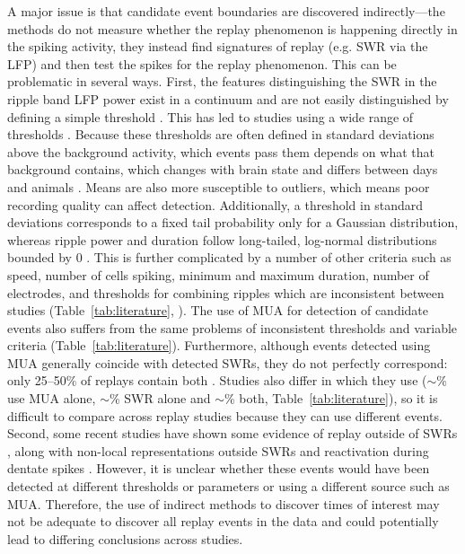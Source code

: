 \documentclass[11pt]{article}
\begin{document}
A major issue is that candidate event boundaries are discovered indirectly—the methods do not measure whether the replay phenomenon is happening directly in the spiking activity, they instead find signatures of replay (e.g. SWR via the LFP) and then test the spikes for the replay phenomenon. This can be problematic in several ways. First, the features distinguishing the SWR in the ripple band LFP power exist in a continuum and are not easily distinguished by defining a simple threshold \cite{YuDistincthippocampalcorticalmemory2017,Liuconsensusstatementdetection2022}. This has led to studies using a wide range of thresholds \cite{Liuconsensusstatementdetection2022}. Because these thresholds are often defined in standard deviations above the background activity, which events pass them depends on what that background contains, which changes with brain state and differs between days and animals \cite{Liuconsensusstatementdetection2022,YuDistincthippocampalcorticalmemory2017}. Means are also more susceptible to outliers, which means poor recording quality can affect detection. Additionally, a threshold in standard deviations corresponds to a fixed tail probability only for a Gaussian distribution, whereas ripple power and duration follow long-tailed, log-normal distributions bounded by 0 \cite{Liuconsensusstatementdetection2022}. This is further complicated by a number of other criteria such as speed, number of cells spiking, minimum and maximum duration, number of electrodes, and thresholds for combining ripples which are inconsistent between studies (Table~\ref{tab:literature}, \cite{Liuconsensusstatementdetection2022}). The use of MUA for detection of candidate events also suffers from the same problems of inconsistent thresholds and variable criteria (Table~\ref{tab:literature}). Furthermore, although events detected using MUA generally coincide with detected SWRs, they do not perfectly correspond: only 25--50\% of replays contain both \cite{WidloskiReplaysharpwave2025}. Studies also differ in which they use ($\sim$\SurveyMuaOnlyFraction\% use MUA alone, $\sim$\SurveySwrOnlyFraction\% SWR alone and $\sim$\SurveySwrAndMuaFraction\% both, Table~\ref{tab:literature}), so it is difficult to compare across replay studies because they can use different events. Second, some recent studies have shown some evidence of replay outside of SWRs \cite{KaeferReplayBehavioralSequences2020,WidloskiFlexiblereroutinghippocampal2022,WidloskiReplaysharpwave2025}, along with non-local representations outside SWRs \cite{CoulterClosedloopmodulationremote2025} and reactivation during dentate spikes \cite{McHughOfflinehippocampalreactivation2024}. However, it is unclear whether these events would have been detected at different thresholds or parameters or using a different source such as MUA. Therefore, the use of indirect methods to discover times of interest may not be adequate to discover all replay events in the data and could potentially lead to differing conclusions across studies.
\end{document}

